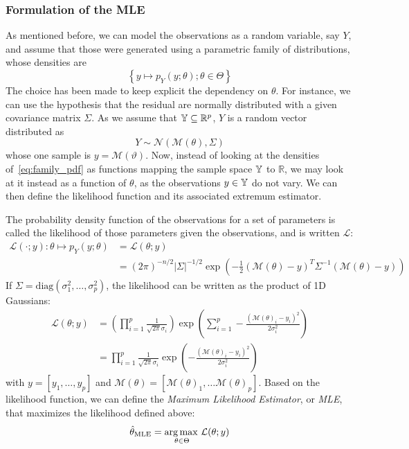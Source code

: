 \documentclass[../../Main_ManuscritThese.tex]{subfiles}
\begin{document}
\subsubsection{Formulation of the MLE}
As mentioned before, we can model the observations as a random variable, say $Y$, and assume that those were generated using a parametric family of distributions, whose densities are
\begin{equation}
  \label{eq:family_pdf}
  \left\{y\mapsto p_{Y}(y; \theta) ; \theta\in\Theta \right\}
\end{equation}
The choice has been made to keep explicit the dependency on $\theta$. For instance, we can use the hypothesis that the residual are normally distributed with a given covariance matrix $\Sigma$. As we assume that $\mathbb{Y} \subseteq \mathbb{R}^p$, $Y$ is a random vector distributed as
\begin{equation}
  \label{eq:lik_gaussian}
  Y  \sim \mathcal{N}(\mathcal{M}(\theta), \Sigma)
\end{equation}
whose one sample is $y=\mathscr{M}(\vartheta)$.
Now, instead of looking at the densities of~\cref{eq:family_pdf} as functions mapping the sample space $\mathbb{Y}$ to $\mathbb{R}$, we may look at it instead as a function of $\theta$, as the observations $y\in\mathbb{Y}$ do not vary. We can then define the likelihood function and its associated extremum estimator.
\begin{definition}
  \label{def:mle}
  The probability density function of the observations for a set of parameters is called the likelihood of those parameters given the observations, and is written $\mathcal{L}$:
  \begin{align}
    \label{eq:likelihood_definition}
    \mathcal{L}(\cdot ;y): \theta \mapsto p_{Y}(y;\theta) &= \mathcal{L}(\theta;y) \\
    &=(2\pi)^{-n/2}\lvert \Sigma \rvert^{-1/2}\exp\left(-\frac{1}{2}(\mathcal{M}(\theta) - y)^T\Sigma^{-1}(\mathcal{M}(\theta) - y)\right)
  \end{align}
  If $\Sigma = \mathrm{diag}(\sigma^2_1,\dots, \sigma^2_p)$, the likelihood can be written as the product of 1D Gaussians: 
  \begin{align}
    \mathcal{L}(\theta;y) &= \left(\prod_{i=1}^p\frac{1}{\sqrt{2\pi}\sigma_i}\right)\exp\left(\sum_{i=1}^p -\frac{(\mathcal{M}(\theta)_i - y_i)^2}{2\sigma^2_i}\right) \\
                          &= \prod_{i=1}^p\frac{1}{\sqrt{2\pi}\sigma_i}\exp\left(-\frac{(\mathcal{M}(\theta)_i - y_i)^2}{2\sigma^2_i}\right)
  \end{align}
  with $y = [y_1, \dots, y_p]$ and $\mathcal{M}(\theta) = [\mathcal{M}(\theta)_1,\dots \mathcal{M}(\theta)_p]$.
  Based on the likelihood function, we can define the \emph{Maximum Likelihood Estimator}, or \emph{MLE}, that maximizes the likelihood defined above:
  \begin{equation}
    \label{eq:def_MLE}
    \hat{\theta}_{\mathrm{MLE}} = \operatorname*{arg\,max \,}_{\theta\in\Theta}\mathcal{L}(\theta;y)
  \end{equation}

\end{definition}
\end{document}
